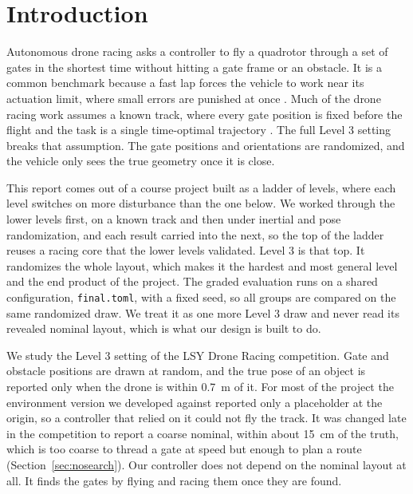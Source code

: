 \documentclass[conference]{IEEEtran}
\begin{document}
\section{Introduction}
Autonomous drone racing asks a controller to fly a quadrotor through a set of gates in the shortest time without hitting a gate frame or an obstacle. It is a common benchmark because a fast lap forces the vehicle to work near its actuation limit, where small errors are punished at once \cite{survey}. Much of the drone racing work assumes a known track, where every gate position is fixed before the flight and the task is a single time-optimal trajectory \cite{foehn,minsnap}. The full Level 3 setting breaks that assumption. The gate positions and orientations are randomized, and the vehicle only sees the true geometry once it is close.

This report comes out of a course project built as a ladder of levels, where each level switches on more disturbance than the one below. We worked through the lower levels first, on a known track and then under inertial and pose randomization, and each result carried into the next, so the top of the ladder reuses a racing core that the lower levels validated. Level 3 is that top. It randomizes the whole layout, which makes it the hardest and most general level and the end product of the project. The graded evaluation runs on a shared configuration, \texttt{final.toml}, with a fixed seed, so all groups are compared on the same randomized draw. We treat it as one more Level 3 draw and never read its revealed nominal layout, which is what our design is built to do.

We study the Level 3 setting of the LSY Drone Racing competition. Gate and obstacle positions are drawn at random, and the true pose of an object is reported only when the drone is within 0.7~m of it. For most of the project the environment version we developed against reported only a placeholder at the origin, so a controller that relied on it could not fly the track. It was changed late in the competition to report a coarse nominal, within about 15~cm of the truth, which is too coarse to thread a gate at speed but enough to plan a route (Section~\ref{sec:nosearch}). Our controller does not depend on the nominal layout at all. It finds the gates by flying and racing them once they are found.
\end{document}
